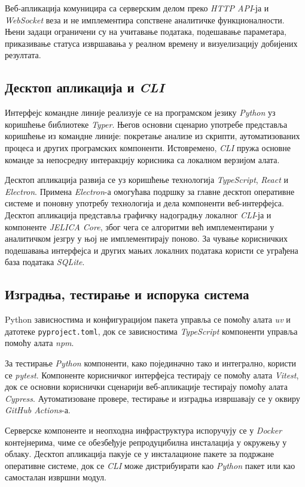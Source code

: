 \documentclass[12pt,oneside]{memoir}
\begin{document}
Веб-апликација комуницира са серверским делом преко \textit{HTTP API}-ја и \textit{WebSocket} веза и не имплементира сопствене аналитичке функционалности. Њени задаци ограничени су на учитавање података, подешавање параметара, приказивање статуса извршавања у реалном времену и визуелизацију добијених резултата.


\subsection{Десктоп апликација и \textit{CLI}}
Интерфејс командне линије реализује се на програмском језику \textit{Python} уз коришћење библиотеке \textit{Typer}. Његов основни сценарио употребе представља коришћење из командне линије: покретање анализе из скрипти, аутоматизованих процеса и других програмских компоненти. Истовремено, \textit{CLI} пружа основне команде за непосредну интеракцију корисника са локалном верзијом алата.

Десктоп апликација развија се уз коришћење технологија \textit{TypeScript}, \textit{React} и \textit{Electron}. Примена \textit{Electron}-а омогућава подршку за главне десктоп оперативне системе и поновну употребу технологија и дела компоненти веб-интерфејса. Десктоп апликација представља графичку надоградњу локалног \textit{CLI}-ја и компоненте \textit{JELICA Core}, због чега се алгоритми већ имплементирани у аналитичком језгру у њој не имплементирају поново. За чување корисничких подешавања интерфејса и других мањих локалних података користи се уграђена база података \textit{SQLite}.


\subsection{Изградња, тестирање и испорука система}
Python зависностима и конфигурацијом пакета управља се помоћу алата \textit{uv} и датотеке \texttt{pyproject.toml}, док се зависностима \textit{TypeScript} компоненти управља помоћу алата \textit{npm}.

За тестирање \textit{Python} компоненти,  како појединачно тако и интегрално, користи се \textit{pytest}. Компоненте корисничког интерфејса тестирају се помоћу алата \textit{Vitest}, док се основни кориснички сценарији веб-апликације тестирају помоћу алата \textit{Cypress}. Аутоматизоване провере, тестирање и изградња извршавају се у оквиру \textit{GitHub Actions}-а.

Серверске компоненте и неопходна инфраструктура испоручују се у \textit{Docker} контејнерима, чиме се обезбеђује репродуцибилна инсталација у окружењу у облаку. Десктоп апликација пакује се у инсталационе пакете за подржане оперативне системе, док се \textit{CLI} може дистрибуирати као \textit{Python} пакет или као самосталан извршни модул.
\end{document}
